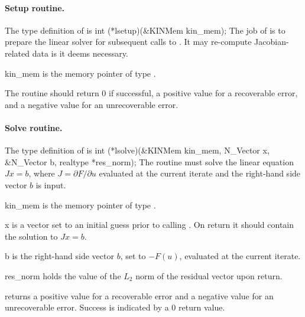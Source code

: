 
\paragraph{Setup routine.} 
The type definition of  is
{
  int (*lsetup)(&KINMem kin\_mem);
}
{
  The job of  is to prepare the linear solver for subsequent 
  calls to . It may re-compute Jacobian-related data is it 
  deems necessary. 
}
{
  \begin{args}
  \item[kin\_mem]
    is the {\kinsol} memory pointer of type .
  \end{args}
}
{
  The  routine should return $0$ if successful,            
  a positive value for a recoverable error, and a negative value  
  for an unrecoverable error.  
}
{}


\paragraph{Solve routine.}
The type definition of  is
{
  int (*lsolve)(&KINMem kin\_mem, N\_Vector x, \\
                &N\_Vector b, realtype *res\_norm);
}
{
  The routine  must solve the linear equation $J x = b$, where         
  $J = \partial F / \partial u$ evaluated at the current iterate
  and the right-hand side vector $b$ is input. 
}
{
  \begin{args}
  \item[kin\_mem]
    is the {\kinsol} memory pointer of type .
  \item[x]
    is a vector set to an initial guess prior to calling . 
    On return it should contain the solution to $J x = b$.
  \item[b]
    is the right-hand side vector $b$, set to $-F(u)$, evaluated at
    the current iterate.
  \item[res\_norm]
    holds the value of the $L_2$ norm of the residual vector upon return.
  \end{args}
}
{
   returns a positive value    
  for a recoverable error and a negative value for an             
  unrecoverable error. Success is indicated by a $0$ return value.
}
{}

